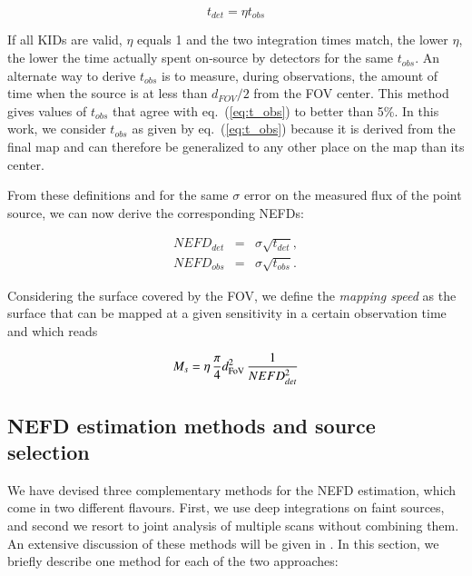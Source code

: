 \begin{equation}
t_{det} = \eta t_{obs}
\label{eq:t_det}
\end{equation}

If all KIDs are valid, $\eta$ equals 1 and the two integration times match, the
lower $\eta$, the lower the time actually spent on-source by detectors for the
same $t_{obs}$. An alternate way to derive $t_{obs}$ is to measure, during
observations, the amount of time when the source is at less than $d_{FOV}/2$
from the FOV center. This method gives values of $t_{obs}$ that agree with
eq.~(\ref{eq:t_obs}) to better than 5\%. In this work, we consider $t_{obs}$ as
given by eq.~(\ref{eq:t_obs}) because it is derived from the final map and can
therefore be generalized to any other place on the map than its center.

From these definitions and for the same $\sigma$ error on the measured flux of
the point source, we can now derive the corresponding NEFDs:

\begin{eqnarray}
NEFD_{det} & = & \sigma \sqrt{t_{det}} \label{eq:nefd_det},\\
NEFD_{obs} & = & \sigma \sqrt{t_{obs}} \label{eq:nefd_obs}.
\end{eqnarray}

Considering the surface covered by the FOV, we define the \emph{mapping speed}
as the surface that can be mapped at a given sensitivity in a certain
observation time and which reads

\begin{equation}
M_s = \eta \, \frac{\pi}{4} d_{\rm{FoV}}^2 \, \frac{1}{NEFD^2_{det}}
\label{eq:mapping_speed}
\end{equation}






\subsection{NEFD estimation methods and source selection}
\label{se:nefd_method}

We have devised three complementary methods for the
NEFD estimation, which come in two different flavours. First, we
use deep integrations on faint sources, and second we resort to 
joint analysis of multiple scans without combining them. An
extensive discussion of these methods will be given in
\citet{Ponthieu2019}. In this section, we briefly describe one method
for each of the two approaches: \\

